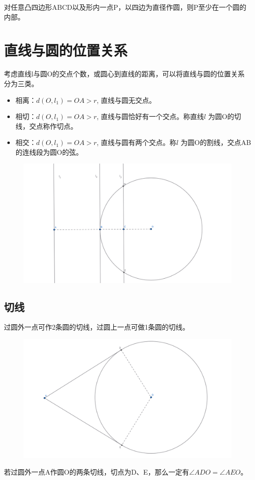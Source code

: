 \begin{example}
    对任意凸四边形ABCD以及形内一点P，以四边为直径作圆，则P至少在一个圆的内部。
\end{example}



\section{直线与圆的位置关系}
考虑直线l与圆O的交点个数，或圆心到直线的距离，可以将直线与圆的位置关系分为三类。
\begin{itemize}
    \item 相离：$d(O,l_1)=OA > r$, 直线与圆无交点。
    \item 相切：$d(O,l_1)=OA > r$, 直线与圆恰好有一个交点。称直线$l$ 为圆O的切线，交点称作切点。
    \item 相交：$d(O,l_1)=OA > r$, 直线与圆有两个交点。称$l$ 为圆O的割线，交点AB的连线段为圆O的弦。
\end{itemize}
\begin{figure}[H]
    \centering
    \includegraphics[width=0.8\linewidth]{figures/直线与圆.png}
\end{figure}



\subsection{切线}
过圆外一点可作2条圆的切线，过圆上一点可做1条圆的切线。
\begin{figure}[H]
    \centering
    \includegraphics[width=0.8\linewidth]{figures/切线.png}
\end{figure}
若过圆外一点A作圆O的两条切线，切点为D、E，那么一定有$\angle ADO=\angle AEO$。

